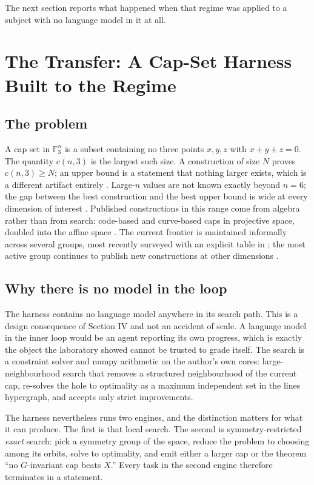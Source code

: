 \documentclass[journal]{IEEEtran}
\begin{document}
The next section reports what happened when that regime was applied to a
subject with no language model in it at all.

\section{The Transfer: A Cap-Set Harness Built to the Regime}

\subsection{The problem}

A cap set in $\mathbb{F}_3^n$ is a subset containing no three points
$x,y,z$ with $x+y+z=0$. The quantity $c(n,3)$ is the largest such size.
A construction of size $N$ proves $c(n,3) \ge N$; an upper bound is a
statement that nothing larger exists, which is a different artifact
entirely \cite{oeis}. Large-$n$ values are not known exactly beyond
$n=6$; the gap between the best construction and the best upper bound is
wide at every dimension of interest
\cite{edel2004,karapetyan2023,funsearch2023,versluis2017}. Published
constructions in this range come from algebra rather than from search:
code-based and curve-based caps in projective space, doubled into the
affine space \cite{edel2004,karapetyan2023,karapetyan2024}. The current frontier is
maintained informally across several groups, most recently surveyed with
an explicit table in \cite{endlessexam2026}; the most active group
continues to publish new constructions at other dimensions
\cite{karapetyan2026}.

\subsection{Why there is no model in the loop}

The harness contains no language model anywhere in its search path. This
is a design consequence of Section IV and not an accident of scale. A
language model in the inner loop would be an agent reporting its own
progress, which is exactly the object the laboratory showed cannot be
trusted to grade itself. The search is a constraint solver and numpy
arithmetic on the author's own cores: large-neighbourhood search that
removes a structured neighbourhood of the current cap, re-solves the hole
to optimality as a maximum independent set in the lines hypergraph, and
accepts only strict improvements.

The harness nevertheless runs two engines, and the distinction matters
for what it can produce. The first is that local search. The second is
symmetry-restricted \emph{exact} search: pick a symmetry group of the
space, reduce the problem to choosing among its orbits, solve to
optimality, and emit either a larger cap or the theorem ``no
$G$-invariant cap beats $X$.'' Every task in the second engine therefore
terminates in a statement.
\end{document}
